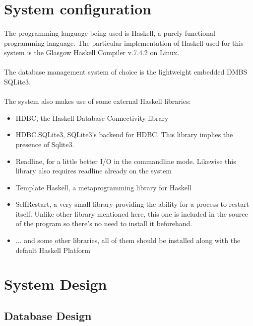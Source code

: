 \documentclass[../gr-final.tex]{subfiles}
\begin{document}
\section{System configuration}

\paragraph{}The programming language being used is Haskell, a purely functional programming language. The particular implementation of Haskell used for this system is the Glasgow  Haskell Compiler v.7.4.2 on Linux.

\paragraph{}The database management system of choice is the lightweight embedded DMBS SQLite3. 

\paragraph{}The system also makes use of some external Haskell libraries: 

\begin{itemize}
\item HDBC, the Haskell Database Connectivity library
\item HDBC.SQLite3, SQLite3's backend for HDBC. This library implies
  the presence of Sqlite3.
\item Readline, for a little better I/O in the
  commandline mode. Likewise this library also requires readline
  already on the system
\item Template Haskell, a metaprogramming library for Haskell
\item SelfRestart, a very small library providing the ability for a
  process to restart itself. Unlike other library mentioned here, this
  one is included in the source of the program so there's no need to
  install it beforehand.
\item ... and some other libraries, all of them should be installed
  along with the default Haskell Platform 
\end{itemize}



\section{System Design}
\subsection{Database Design}
\end{document}
